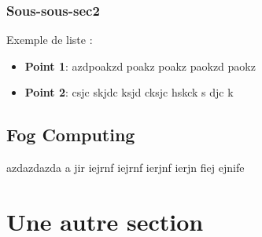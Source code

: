 \subsubsection{Sous-sous-sec2}
Exemple de liste :

\begin{itemize}
	\item \textbf{Point 1}: azdpoakzd poakz poakz paokzd paokz 
	\item \textbf{Point 2}: csjc skjdc ksjd cksjc hskck s djc k
\end{itemize}
\subsection{Fog Computing}
azdazdazda a  jir iejrnf iejrnf ierjnf ierjn fiej ejnife
\section{Une autre section}
\lipsum[1-1] %
